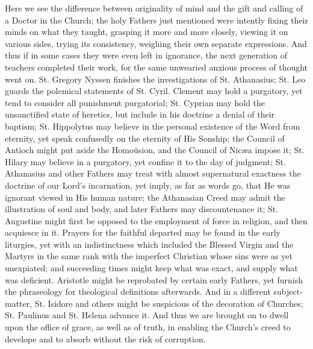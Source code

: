 Here we see the difference between originality of mind
and the gift and calling of a Doctor in the Church; the
holy Fathers just mentioned were intently fixing their
minds on what they taught, grasping it more and more
closely, viewing it on various sides, trying its
consistency, weighing their own separate expressions. And
thus if in some cases they were even left in ignorance,
the next generation of teachers completed their work, for
the same unwearied anxious process of thought went on.
St. Gregory Nyssen finishes the investigations of St.
Athanasius; St. Leo guards the polemical statements of
St. Cyril. Clement may hold a purgatory, yet tend to
consider all punishment purgatorial; St. Cyprian may hold
the unsanctified state of heretics, but include in his
doctrine a denial of their baptism; St. Hippolytus may
believe in the personal existence of the Word from
eternity, yet speak confusedly on the eternity of His
Sonship; the Council of Antioch might put aside the
Homoüsion, and the Council of Nicæa impose it; St.
Hilary may believe in a purgatory, yet confine it to the
day of judgment; St. Athanasius and other Fathers may
treat with almost supernatural exactness the doctrine of
our Lord's incarnation, yet imply, as far as words go,
that He was ignorant viewed in His human nature; the
Athanasian Creed may admit the illustration of soul and
body, and later Fathers may discountenance it; St.
Augustine might first be opposed to the employment of
force in religion, and then acquiesce in it. Prayers for
the faithful departed may be found in the early
liturgies, yet with an indistinctness which included the
Blessed Virgin and the Martyrs in the same rank with the
imperfect Christian whose sins were as yet unexpiated;
and succeeding times might keep what was exact, and
supply what was deficient. Aristotle might be reprobated
by certain early Fathers, yet furnish the
phraseology for theological definitions afterwards. And
in a different subject-matter, St. Isidore and others
might be suspicious of the decoration of Churches; St.
Paulinus and St. Helena advance it. And thus we are
brought on to dwell upon the office of grace, as well as
of truth, in enabling the Church's creed to develope and
to absorb without the risk of corruption.


